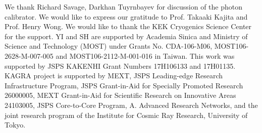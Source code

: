 \documentclass[%
 reprint,
superscriptaddress,
 amsmath,amssymb,
 aps,
]{revtex4-1}
\begin{document}
\acknowledgments     %
 
We thank Richard Savage, Darkhan Tuyrnbayev for discussion of the photon calibrator. We would like to express our gratitude to Prof. Takaaki Kajita and Prof. Henry Wong. We would like to thank the KEK Cryogenics Science Center for the support. YI and SH are supported by Academia Sinica and Ministry of Science and Technology (MOST) under Grants No. CDA-106-M06, MOST106-2628-M-007-005 and MOST106-2112-M-001-016 in Taiwan. This work was supported by JSPS KAKENHI Grant Numbers 17H106133 and 17H01135. KAGRA project is supported by MEXT, JSPS Leading-edge Research Infrastructure Program, JSPS Grant-in-Aid for Specially Promoted Research 26000005, MEXT Grant-in-Aid for Scientific Research on Innovative Areas 24103005, JSPS Core-to-Core Program, A. Advanced Research Networks, and the joint research program of the Institute for Cosmic Ray Research, University of Tokyo.


\end{document}
